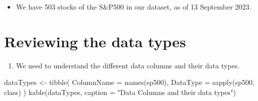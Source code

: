 \documentclass[
  letterpaper,
  DIV=11,
  numbers=noendperiod]{scrreport}
\newenvironment{Shaded}{\begin{snugshade}}{\end{snugshade}}
\newcommand{\AttributeTok}[1]{\textcolor[rgb]{0.40,0.45,0.13}{#1}}
\newcommand{\FunctionTok}[1]{\textcolor[rgb]{0.28,0.35,0.67}{#1}}
\newcommand{\NormalTok}[1]{\textcolor[rgb]{0.00,0.23,0.31}{#1}}
\newcommand{\OtherTok}[1]{\textcolor[rgb]{0.00,0.23,0.31}{#1}}
\newcommand{\StringTok}[1]{\textcolor[rgb]{0.13,0.47,0.30}{#1}}
\providecommand{\tightlist}{%
  \setlength{\itemsep}{0pt}\setlength{\parskip}{0pt}}\usepackage{longtable,booktabs,array}
\begin{document}
\begin{itemize}
\tightlist
\item
  We have 503 stocks of the S\&P500 in our dataset, as of 13 September
  2023.
\end{itemize}

\hypertarget{reviewing-the-data-types}{%
\section{Reviewing the data types}\label{reviewing-the-data-types}}

\begin{enumerate}
\def\labelenumi{\arabic{enumi}.}
\tightlist
\item
  We need to understand the different data columns and their data types.
\end{enumerate}

\begin{Shaded}
\begin{Highlighting}[]
\NormalTok{dataTypes }\OtherTok{\textless{}{-}} \FunctionTok{tibble}\NormalTok{(}
  \AttributeTok{ColumnName =} \FunctionTok{names}\NormalTok{(sp500),}
  \AttributeTok{DataType =} \FunctionTok{sapply}\NormalTok{(sp500, class)}
\NormalTok{)}
\FunctionTok{kable}\NormalTok{(dataTypes, }\AttributeTok{caption =} \StringTok{"Data Columns and their data types"}\NormalTok{) }
\end{Highlighting}
\end{Shaded}
\end{document}
